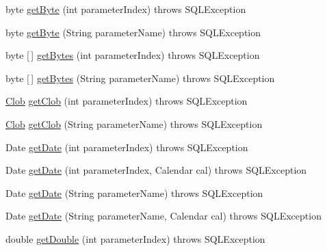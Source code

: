 \begin{DoxyCompactItemize}
\item 
byte \mbox{\hyperlink{classcom_1_1mysql_1_1jdbc_1_1_callable_statement_afba99b96d6516655bdf25f4dfa49b687}{get\+Byte}} (int parameter\+Index)  throws S\+Q\+L\+Exception 
\item 
byte \mbox{\hyperlink{classcom_1_1mysql_1_1jdbc_1_1_callable_statement_aea67d241da9e8e7001ac6312ff079ae2}{get\+Byte}} (String parameter\+Name)  throws S\+Q\+L\+Exception 
\item 
byte \mbox{[}$\,$\mbox{]} \mbox{\hyperlink{classcom_1_1mysql_1_1jdbc_1_1_callable_statement_a8283d495de6954580d193c053fbfcb11}{get\+Bytes}} (int parameter\+Index)  throws S\+Q\+L\+Exception 
\item 
byte \mbox{[}$\,$\mbox{]} \mbox{\hyperlink{classcom_1_1mysql_1_1jdbc_1_1_callable_statement_aaee5dbe4c81955ef3696f2b99b41f24b}{get\+Bytes}} (String parameter\+Name)  throws S\+Q\+L\+Exception 
\item 
\mbox{\hyperlink{classcom_1_1mysql_1_1jdbc_1_1_clob}{Clob}} \mbox{\hyperlink{classcom_1_1mysql_1_1jdbc_1_1_callable_statement_a86bdc2b6cf993a96d55207239dfbfb86}{get\+Clob}} (int parameter\+Index)  throws S\+Q\+L\+Exception 
\item 
\mbox{\hyperlink{classcom_1_1mysql_1_1jdbc_1_1_clob}{Clob}} \mbox{\hyperlink{classcom_1_1mysql_1_1jdbc_1_1_callable_statement_adf34ed70bb4d8cde9bf4e5912c1a6e05}{get\+Clob}} (String parameter\+Name)  throws S\+Q\+L\+Exception 
\item 
Date \mbox{\hyperlink{classcom_1_1mysql_1_1jdbc_1_1_callable_statement_aa50f27f2049ef5a4d632bf90d49406c3}{get\+Date}} (int parameter\+Index)  throws S\+Q\+L\+Exception 
\item 
Date \mbox{\hyperlink{classcom_1_1mysql_1_1jdbc_1_1_callable_statement_a8ab6fc7be6dedec149de4fa5062c88a3}{get\+Date}} (int parameter\+Index, Calendar cal)  throws S\+Q\+L\+Exception 
\item 
Date \mbox{\hyperlink{classcom_1_1mysql_1_1jdbc_1_1_callable_statement_a446e34b8c116c446ad585e8efab08f8d}{get\+Date}} (String parameter\+Name)  throws S\+Q\+L\+Exception 
\item 
Date \mbox{\hyperlink{classcom_1_1mysql_1_1jdbc_1_1_callable_statement_a505f0e9a0a426dd9c71cd0e4a43bd13e}{get\+Date}} (String parameter\+Name, Calendar cal)  throws S\+Q\+L\+Exception 
\item 
double \mbox{\hyperlink{classcom_1_1mysql_1_1jdbc_1_1_callable_statement_a08f25a1b0d48b0085e418aaf5445ce19}{get\+Double}} (int parameter\+Index)  throws S\+Q\+L\+Exception 
\item 

\end{DoxyCompactItemize}
